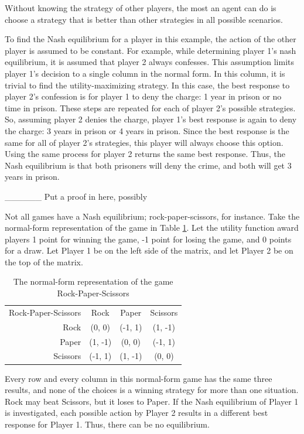 Without knowing the strategy of other players, the most an agent can do is choose a strategy that is better than other strategies in all possible scenarios. 

To find the Nash equilibrium for a player in this example, the action of the other player is assumed to be constant. For example, while determining player 1's nash equilibrium, it is assumed that player 2 always confesses. This assumption limits player 1's decision to a single column in the normal form. In this column, it is trivial to find the utility-maximizing strategy. In this case, the best response to player 2's confession is for player 1 to deny the charge: 1 year in prison or no time in prison. These steps are repeated for each of player 2's possible strategies. So, assuming player 2 denies the charge, player 1's best response is again to deny the charge: 3 years in prison or 4 years in prison. Since the best response is the same for all of player 2's strategies, this player will always choose this option. Using the same process for player 2 returns the same best response. Thus, the Nash equilibrium is that both prisoners will deny the crime, and both will get 3 years in prison.

\_\_\_\_\_\_ Put a proof in here, possibly

Not all games have a Nash equilibrium; rock-paper-scissors, for instance. Take the normal-form representation of the game in Table \ref{table:RPS}. Let the utility function award players 1 point for winning the game, -1 point for losing the game, and 0 points for a draw. Let Player 1 be on the left side of the matrix, and let Player 2 be on the top of the matrix.
\begin{table}[h]
  \centering
  \begin{tabular}{r | c | c | c |}
    \multicolumn{1}{c}{Rock-Paper-Scissors}&\multicolumn{1}{c}{Rock}&\multicolumn{1}{c}{Paper}&\multicolumn{1}{c}{Scissors} \\ \cline{2-4}
    Rock & (0, 0) & (-1, 1) & (1, -1) \\ \cline{2-4}
    Paper & (1, -1) & (0, 0) & (-1, 1) \\ \cline{2-4}
    Scissors & (-1, 1) & (1, -1) & (0, 0) \\ \cline{2-4}
  \end{tabular}
  \caption{The normal-form representation of the game Rock-Paper-Scissors}
  \label{table:RPS}
\end{table}

Every row and every column in this normal-form game has the same three results, and none of the choices is a winning strategy for more than one situation. Rock may beat Scissors, but it loses to Paper. If the Nash equilibrium of Player 1 is investigated, each possible action by Player 2 results in a different best response for Player 1. Thus, there can be no equilibrium.

